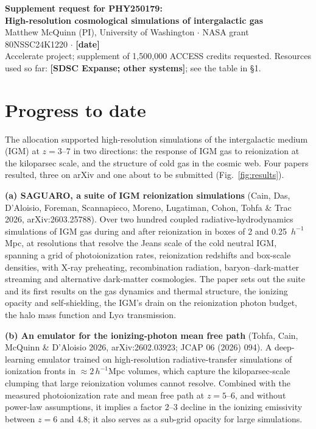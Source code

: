\documentclass[11pt]{article}
\newcommand{\todo}[1]{\textbf{[#1]}}
\begin{document}
\begin{center}
{\large\bfseries Supplement request for PHY250179:\\
High-resolution cosmological simulations of intergalactic gas}\\[0.4ex]
Matthew McQuinn (PI), University of Washington \quad $\cdot$ \quad NASA grant 80NSSC24K1220 \quad $\cdot$ \quad \todo{date}\\
Accelerate project; supplement of 1{,}500{,}000 ACCESS credits requested.
Resources used so far: \todo{SDSC Expanse; other systems}; see the table in \S1.
\end{center}

\section{Progress to date}

The allocation supported high-resolution simulations of the intergalactic
medium (IGM) at $z = 3$--$7$ in two directions: the response of IGM gas to
reionization at the kiloparsec scale, and the structure of cold gas in the
cosmic web. Four papers resulted, three on arXiv and one about to be
submitted (Fig.~\ref{fig:results}).

\textbf{(a) SAGUARO, a suite of IGM reionization simulations} (Cain, Das,
D'Aloisio, Foreman, Scannapieco, Moreno, Lugatiman, Cohon, Tohfa \& Trac 2026,
arXiv:2603.25788). Over two hundred coupled radiative-hydrodynamics
simulations of IGM gas during and after reionization in boxes of 2 and
0.25~$h^{-1}$Mpc, at resolutions that resolve the Jeans scale of the cold
neutral IGM, spanning a grid of photoionization rates, reionization redshifts
and box-scale densities, with X-ray preheating, recombination radiation,
baryon--dark-matter streaming and alternative dark-matter cosmologies. The
paper sets out the suite and its first results on the gas dynamics and
thermal structure, the ionizing opacity and self-shielding, the IGM's drain on
the reionization photon budget, the halo mass function and Ly$\alpha$
transmission.

\textbf{(b) An emulator for the ionizing-photon mean free path} (Tohfa, Cain,
McQuinn \& D'Aloisio 2026, arXiv:2602.03923; JCAP 06 (2026) 094). A
deep-learning emulator trained on high-resolution radiative-transfer
simulations of ionization fronts in $\approx 2\,h^{-1}$Mpc volumes, which
capture the kiloparsec-scale clumping that large reionization volumes cannot
resolve. Combined with the measured photoionization rate and mean free path at
$z = 5$--$6$, and without power-law assumptions, it implies a factor 2--3
decline in the ionizing emissivity between $z = 6$ and $4.8$; it also serves
as a sub-grid opacity for large simulations.
\end{document}
